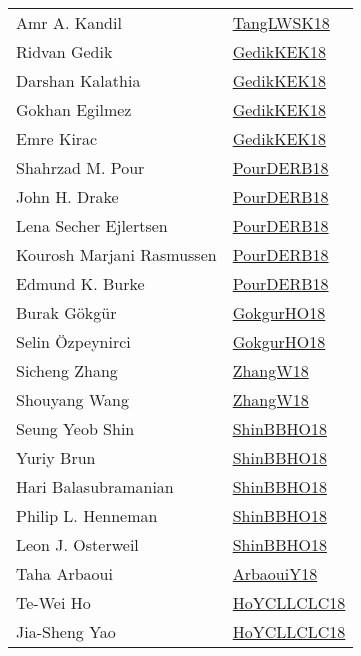 {\begin{longtable}{p{4cm}p{15cm}}
Amr A. Kandil & \href{articles/TangLWSK18.pdf}{TangLWSK18}\cite{TangLWSK18} \\
Ridvan Gedik & \href{articles/GedikKEK18.pdf}{GedikKEK18}\cite{GedikKEK18} \\
Darshan Kalathia & \href{articles/GedikKEK18.pdf}{GedikKEK18}\cite{GedikKEK18} \\
Gokhan Egilmez & \href{articles/GedikKEK18.pdf}{GedikKEK18}\cite{GedikKEK18} \\
Emre Kirac & \href{articles/GedikKEK18.pdf}{GedikKEK18}\cite{GedikKEK18} \\
Shahrzad M. Pour & \href{articles/PourDERB18.pdf}{PourDERB18}\cite{PourDERB18} \\
John H. Drake & \href{articles/PourDERB18.pdf}{PourDERB18}\cite{PourDERB18} \\
Lena Secher Ejlertsen & \href{articles/PourDERB18.pdf}{PourDERB18}\cite{PourDERB18} \\
Kourosh Marjani Rasmussen & \href{articles/PourDERB18.pdf}{PourDERB18}\cite{PourDERB18} \\
Edmund K. Burke & \href{articles/PourDERB18.pdf}{PourDERB18}\cite{PourDERB18} \\
Burak G{\"{o}}kg{\"{u}}r & \href{articles/GokgurHO18.pdf}{GokgurHO18}\cite{GokgurHO18} \\
Selin {\"{O}}zpeynirci & \href{articles/GokgurHO18.pdf}{GokgurHO18}\cite{GokgurHO18} \\
Sicheng Zhang & \href{articles/ZhangW18.pdf}{ZhangW18}\cite{ZhangW18} \\
Shouyang Wang & \href{articles/ZhangW18.pdf}{ZhangW18}\cite{ZhangW18} \\
Seung Yeob Shin & \href{articles/ShinBBHO18.pdf}{ShinBBHO18}\cite{ShinBBHO18} \\
Yuriy Brun & \href{articles/ShinBBHO18.pdf}{ShinBBHO18}\cite{ShinBBHO18} \\
Hari Balasubramanian & \href{articles/ShinBBHO18.pdf}{ShinBBHO18}\cite{ShinBBHO18} \\
Philip L. Henneman & \href{articles/ShinBBHO18.pdf}{ShinBBHO18}\cite{ShinBBHO18} \\
Leon J. Osterweil & \href{articles/ShinBBHO18.pdf}{ShinBBHO18}\cite{ShinBBHO18} \\
Taha Arbaoui & \href{papers/ArbaouiY18.pdf}{ArbaouiY18}\cite{ArbaouiY18} \\
Te{-}Wei Ho & \href{papers/HoYCLLCLC18.pdf}{HoYCLLCLC18}\cite{HoYCLLCLC18} \\
Jia{-}Sheng Yao & \href{papers/HoYCLLCLC18.pdf}{HoYCLLCLC18}\cite{HoYCLLCLC18} \\

\end{longtable}}
